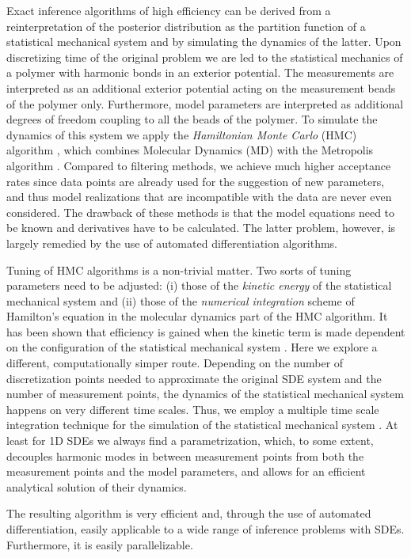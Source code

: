 \documentclass[12pt,a4paper,final]{iopart}
\begin{document}
Exact inference algorithms of high efficiency can be derived from a reinterpretation of the posterior distribution as the partition function of a statistical mechanical system and by simulating the dynamics of the latter.
Upon discretizing time of the original problem we are led to the statistical mechanics of a polymer with harmonic bonds in an exterior potential. The measurements are interpreted as an additional exterior potential acting on the measurement beads of the polymer only.
Furthermore, model parameters are interpreted as additional degrees of freedom coupling to all the beads of the polymer.
To simulate the dynamics of this system we apply the {\em Hamiltonian Monte Carlo} (HMC) algorithm \cite{duane_1987}, which combines Molecular Dynamics (MD) \cite{alder_1959_MD, rahman_1964_MD} with the Metropolis algorithm \cite{metropolis_1953}.
Compared to filtering methods, we achieve much higher acceptance rates since data points are already used for the suggestion of new parameters, and thus model realizations that are incompatible with the data are never even considered.
The drawback of these methods is that the model equations need to be known and derivatives have to be calculated. The latter problem, however, is largely remedied by the use of automated differentiation algorithms.

Tuning of HMC algorithms is a non-trivial matter.
Two sorts of tuning parameters need to be adjusted: (i) those of the {\em kinetic energy} of the statistical mechanical system and (ii) those of the {\em numerical integration} scheme of Hamilton's equation in the molecular dynamics part of the HMC algorithm.
It has been shown that efficiency is gained when the kinetic term is made dependent on the configuration of the statistical mechanical system \cite{girolami_2011_HMC}.
Here we explore a different, computationally simper route.
Depending on the number of discretization points needed to approximate the original SDE system and the number of measurement points, the dynamics of the statistical mechanical system happens on very different time scales.
Thus, we employ a multiple time scale integration technique for the simulation of the statistical mechanical system \cite{tuckerman_1993}.
At least for 1D SDEs we always find a parametrization, which, to some extent, decouples harmonic modes in between measurement points from both the measurement points and the model parameters, and allows for an efficient analytical solution of their dynamics.

The resulting algorithm is very efficient and, through the use of automated differentiation, easily applicable to a wide range of inference problems with SDEs.
Furthermore, it is easily parallelizable.
\end{document}
